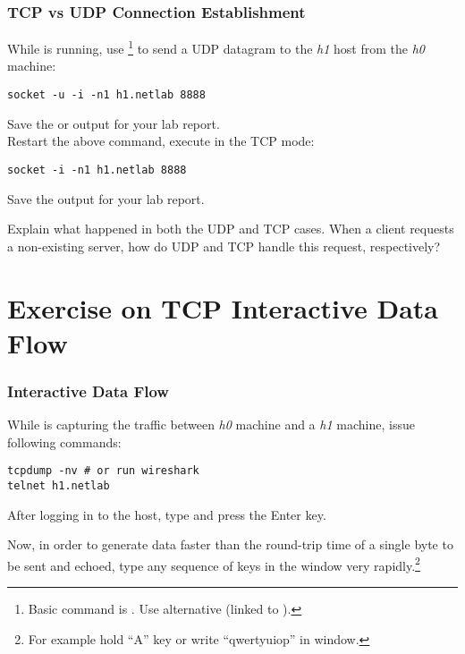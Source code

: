 \documentclass{../UTNetLab}
\begin{document}
\section{TCP vs UDP Connection Establishment}
While  is running, use \footnote{Basic command is . Use alternative  (linked to ).} to send a UDP datagram to the \textit{h1} host from the \textit{h0} machine:
\begin{lstlisting}[emph={h0,h1,netlab}]
socket -u -i -n1 h1.netlab 8888
    \end{lstlisting}
{Save} the  or  output for your lab report. \\
Restart the above  command, execute  in the TCP mode:
\begin{lstlisting}[emph={h1,netlab}]
socket -i -n1 h1.netlab 8888
    \end{lstlisting}
{Save} the  output for your lab report.

\begin{report}
    \item Explain what happened in both the UDP and TCP cases.
    When a client requests a non-existing server, how do UDP and TCP handle this request, respectively?
\end{report}

\part{Exercise on TCP Interactive Data Flow}
\section{Interactive Data Flow}
While  is capturing the traffic between \textit{h0} machine and a \textit{h1} machine, issue following commands:
\begin{lstlisting}[emph={h1,netlab}]
tcpdump -nv # or run wireshark
telnet h1.netlab
    \end{lstlisting}
After logging in to the host, type  and press the {Enter} key.

Now, in order to generate data faster than the round-trip time of a single byte to be sent and echoed, type any sequence of keys in the  window very rapidly.\footnote{For example hold ``A'' key or write ``qwertyuiop'' in  window.}
\end{document}
